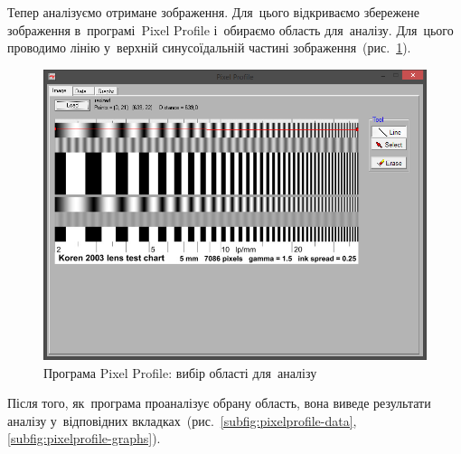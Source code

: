 \documentclass[
	a4paper,
	oneside,
	BCOR = 10mm,
	DIV = 12,
	12pt,
	headings = normal,
]{scrartcl}
\begin{document}
		Тепер аналізуємо отримане зображення. Для~цього відкриваємо збережене зображення в~програмі~\textenglish{Pixel Profile} і~обираємо область для~аналізу. Для~цього проводимо лінію у~верхній синусоїдальній частині зображення~(рис.~\ref{fig:pixelprofile-image}).
		\begin{figure}[!htbp]
			\centering
			\includegraphics[height=10\baselineskip]{./assets/y03s02-pcdiag-lab-06-p00-pixelprofile.png}
			\caption{Програма \textenglish{Pixel Profile}: вибір області для~аналізу}
			\label{fig:pixelprofile-image}
		\end{figure}

		Після того, як~програма проаналізує обрану область, вона виведе результати аналізу у~відповідних вкладках~(рис.~\ref{subfig:pixelprofile-data}, \ref{subfig:pixelprofile-graphs}).
\end{document}

